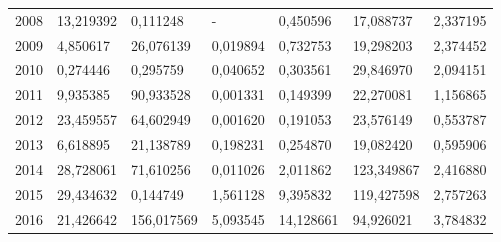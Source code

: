 \begin{table}
\begin{tabular}{p{1cm}p{2cm}p{2cm}p{2cm}p{2cm}p{2cm}p{2cm}}
 2008 &                        13,219392 &                                     0,111248 &                               - &                        0,450596 &                      17,088737 &                                     2,337195 \\
 2009 &                         4,850617 &                                    26,076139 &                        0,019894 &                        0,732753 &                      19,298203 &                                     2,374452 \\
 2010 &                         0,274446 &                                     0,295759 &                        0,040652 &                        0,303561 &                      29,846970 &                                     2,094151 \\
 2011 &                         9,935385 &                                    90,933528 &                        0,001331 &                        0,149399 &                      22,270081 &                                     1,156865 \\
 2012 &                        23,459557 &                                    64,602949 &                        0,001620 &                        0,191053 &                      23,576149 &                                     0,553787 \\
 2013 &                         6,618895 &                                    21,138789 &                        0,198231 &                        0,254870 &                      19,082420 &                                     0,595906 \\
 2014 &                        28,728061 &                                    71,610256 &                        0,011026 &                        2,011862 &                     123,349867 &                                     2,416880 \\
 2015 &                        29,434632 &                                     0,144749 &                        1,561128 &                        9,395832 &                     119,427598 &                                     2,757263 \\
 2016 &                        21,426642 &                                   156,017569 &                        5,093545 &                       14,128661 &                      94,926021 &                                     3,784832 \\
\bottomrule
\end{tabular}
\end{table}

